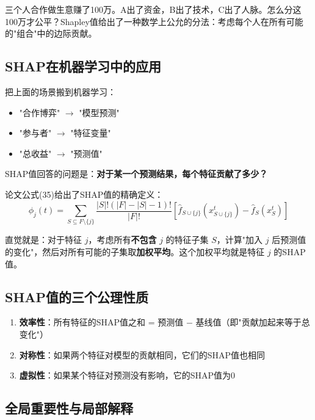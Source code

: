 \documentclass[12pt, a4paper]{article}
\begin{document}
\begin{examplebox}[Shapley值的原始场景]
三个人合作做生意赚了100万。A出了资金，B出了技术，C出了人脉。怎么分这100万才公平？Shapley值给出了一种数学上公允的分法：考虑每个人在所有可能的"组合"中的边际贡献。
\end{examplebox}

\subsection{SHAP在机器学习中的应用}

把上面的场景搬到机器学习：
\begin{itemize}[leftmargin=2em]
\item "合作博弈" $\to$ "模型预测"
\item "参与者" $\to$ "特征变量"
\item "总收益" $\to$ "预测值"
\end{itemize}

SHAP值回答的问题是：\textbf{对于某一个预测结果，每个特征贡献了多少？}

论文公式(35)给出了SHAP值的精确定义：
\[
\phi_j(t) = \sum_{S \subseteq F \setminus \{j\}} \frac{|S|!(|F|-|S|-1)!}{|F|!} \left[ \hat{f}_{S \cup \{j\}}(x_{S \cup \{j\}}^t) - \hat{f}_S(x_S^t) \right]
\]

\begin{tipbox}[不用被这个公式吓到]
直觉就是：对于特征 $j$，考虑所有\textbf{不包含} $j$ 的特征子集 $S$，计算"加入 $j$ 后预测值的变化"，然后对所有可能的子集取\textbf{加权平均}。这个加权平均就是特征 $j$ 的SHAP值。
\end{tipbox}

\subsection{SHAP值的三个公理性质}

\begin{enumerate}[leftmargin=2em]
\item \textbf{效率性}：所有特征的SHAP值之和 = 预测值 $-$ 基线值（即"贡献加起来等于总变化"）
\item \textbf{对称性}：如果两个特征对模型的贡献相同，它们的SHAP值也相同
\item \textbf{虚拟性}：如果某个特征对预测没有影响，它的SHAP值为0
\end{enumerate}

\subsection{全局重要性与局部解释}
\end{document}
